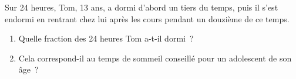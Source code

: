 \documentclass[exercice]{thedocument}%
\begin{document}
%
    Sur 24 heures, Tom, 13 ans, a dormi d'abord un tiers du temps, puis il
    s'est endormi en rentrant chez lui après les cours pendant un douzième de
    ce temps.
    \begin{enumerate}
        \item Quelle fraction des 24 heures Tom a-t-il dormi~?
        \item Cela correspond-il au temps de sommeil conseillé pour un adolescent
        de son âge~?
    \end{enumerate}
    {\centering{}\par}
\end{document}
